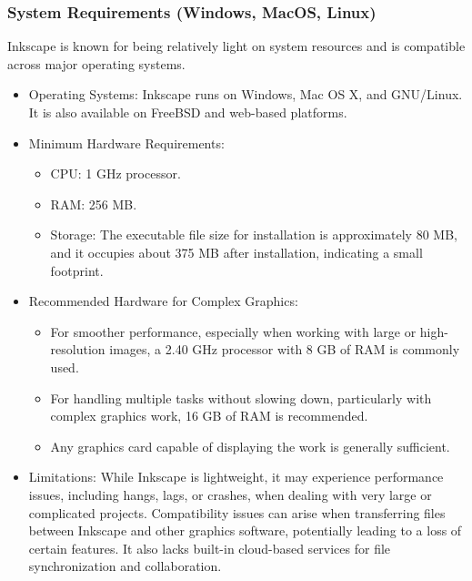 \subsubsection{System Requirements (Windows, MacOS, Linux)}

Inkscape is known for being relatively light on system resources and is compatible across major operating systems.\cite{BlindHelpDBT}

\begin{itemize}
    \item Operating Systems: Inkscape runs on Windows, Mac OS X, and GNU/Linux.\cite{BlindHelpDBT} It is also available on FreeBSD and web-based platforms.\cite{BlindHelpDBT}
    \item Minimum Hardware Requirements:
    \begin{itemize}
        \item CPU: 1 GHz processor.\cite{BlindHelpDBT}
        \item RAM: 256 MB.\cite{BlindHelpDBT}
        \item Storage: The executable file size for installation is approximately 80 MB, and it occupies about 375 MB after installation, indicating a small footprint.\cite{BlindHelpDBT}
    \end{itemize}
    \item Recommended Hardware for Complex Graphics:
    \begin{itemize}
        \item For smoother performance, especially when working with large or high-resolution images, a 2.40 GHz processor with 8 GB of RAM is commonly used.\cite{BlindHelpDBT}
        \item For handling multiple tasks without slowing down, particularly with complex graphics work, 16 GB of RAM is recommended.\cite{BlindHelpDBT}
        \item Any graphics card capable of displaying the work is generally sufficient.\cite{BlindHelpDBT}
    \end{itemize}
    \item Limitations: While Inkscape is lightweight, it may experience performance issues, including hangs, lags, or crashes, when dealing with very large or complicated projects.\cite{BlindHelpDBT} Compatibility issues can arise when transferring files between Inkscape and other graphics software, potentially leading to a loss of certain features.\cite{BlindHelpDBT} It also lacks built-in cloud-based services for file synchronization and collaboration.\cite{BlindHelpDBT}
\end{itemize}

